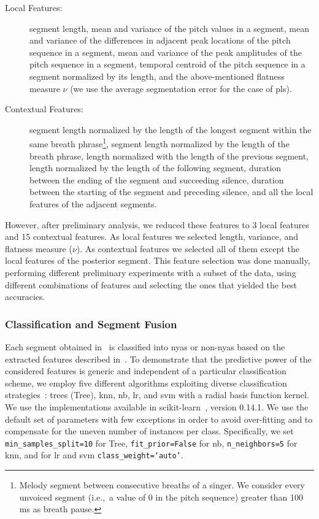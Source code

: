 {\begin{description}
	\item[Local Features:] segment length, mean and variance of the pitch values in a segment, mean and variance of the differences in adjacent peak locations of the pitch sequence in a segment, mean and variance of the  peak amplitudes of the pitch sequence in a segment, temporal centroid of the pitch sequence in a segment normalized by its length, and the above-mentioned flatness measure $\nu$ (we use the average segmentation error for the case of \gls{pls}).
	\item[Contextual Features:] segment length normalized by the length of the longest segment within the same breath phrase\footnote{Melody segment between consecutive breaths of a singer. We consider every unvoiced segment (i.e.,~a value of 0 in the pitch sequence) greater than 100\,ms as breath pause.}, segment length normalized by the length of the breath phrase, length normalized with the length of the previous segment, length normalized by the length of the following segment, duration between the ending of the segment and succeeding silence, duration between the starting of the segment and preceding silence, and all the local features of the adjacent segments.
\end{description}

However, after preliminary analysis, we reduced these features to 3 local features and 15 contextual features. As local features we selected length, variance, and flatness measure ($\nu$). As contextual features we selected all of them except the local features of the posterior segment. This feature selection was done manually, performing different preliminary experiments with a subset of the data, using different combinations of features and selecting the ones that yielded the best accuracies.

\subsubsection{Classification and Segment Fusion}

Each segment obtained in~ is classified into \gls{nyas} or non-\gls{nyas} based on the extracted features described in~. To demonstrate that the predictive power of the considered features is generic and independent of a particular classification scheme, we employ five different algorithms exploiting diverse classification strategies~\citep{Hastie09BOOK}: trees (Tree), \gls{knn}, \gls{nb}, \gls{lr}, and \gls{svm} with a radial basis function kernel. We use the implementations available in scikit-learn~\citep{scikitlearn}, version 0.14.1. We use the default set of parameters with few exceptions in order to avoid over-fitting and to compensate for the uneven number of instances per class. Specifically, we set \texttt{min\_samples\_split=10} for Tree, \texttt{fit\_prior=False} for \gls{nb}, \texttt{n\_neighbors=5} for \gls{knn}, and for \gls{lr} and \gls{svm} \texttt{class\_weight=`auto'}.

}
